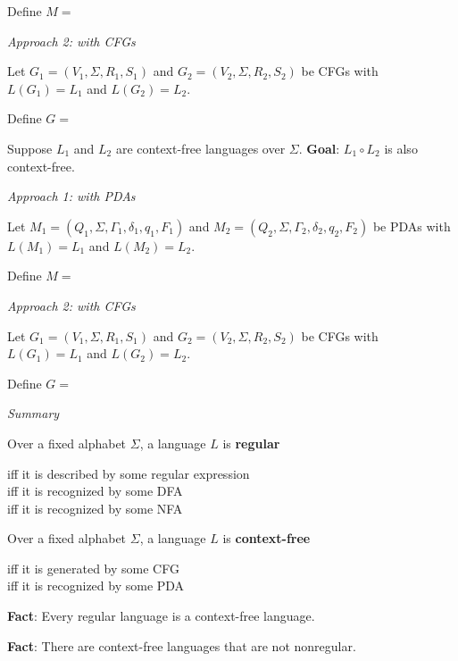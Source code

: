 \documentclass[12pt, oneside]{article}
\begin{document}
Define $M = $

\vfill

{\it Approach  2: with CFGs}

Let $G_1 = (V_1, \Sigma, R_1, S_1)$  and   $G_2 = (V_2, \Sigma, R_2, S_2)$  be CFGs  with
$L(G_1) =  L_1$  and  $L(G_2) = L_2$.

Define $G = $

\vfill

\newpage
Suppose $L_1$ and $L_2$ are context-free languages over $\Sigma$.  {\bf Goal}:  $L_1 \circ L_2$  is  also context-free.


{\it Approach 1: with  PDAs}

Let $M_1 = ( Q_1, \Sigma, \Gamma_1, \delta_1, q_1, F_1)$ and
$M_2 = ( Q_2, \Sigma, \Gamma_2, \delta_2, q_2, F_2)$ be PDAs with 
$L(M_1) =  L_1$  and  $L(M_2) = L_2$.

Define $M = $

\vfill

{\it Approach  2: with CFGs}

Let $G_1 = (V_1, \Sigma, R_1, S_1)$  and   $G_2 = (V_2, \Sigma, R_2, S_2)$  be CFGs  with
$L(G_1) =  L_1$  and  $L(G_2) = L_2$.

Define $G = $

\vfill

{\it Summary}

Over a fixed alphabet $\Sigma$, a language $L$ is {\bf regular}

\vspace{-20pt}
\begin{center}
    iff it is described by some regular expression \\
    iff it is recognized by some DFA\\
    iff it is recognized by some NFA
\end{center}

Over a fixed alphabet $\Sigma$, a language $L$ is {\bf context-free}

\vspace{-20pt}
\begin{center}
    iff it is generated by some CFG\\
    iff it is recognized by some PDA
\end{center}

\vfill

{\bf Fact}: Every regular language is a context-free language.

\vfill

{\bf Fact}: There are context-free languages that are not nonregular.
\end{document}
